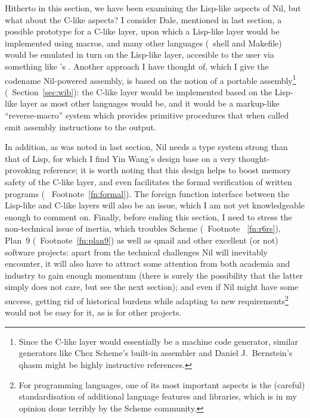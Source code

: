 Hitherto in this section, we have been examining the Lisp-like aspects of Nil,
but what about the C-like aspects?  I consider Dale, mentioned in last section,
a possible prototype for a C-like layer, upon which a Lisp-like layer would
be implemented using macros, and many other languages (\eg~shell and Makefile)
would be emulated in turn on the Lisp-like layer, accesible to the user via
something like 's .  Another approach I
have thought of, which I give the codename Nil-powered assembly, is based on the
notion of a portable assembly\footnote{Since the C-like layer would essentially
be a machine code generator, similar generators like Chez Scheme's built-in
assembler and Daniel J.\ Bernstein's qhasm might be highly instructive
references.} (\cf~Section~\ref{sec:wib}): the C-like layer would be implemented
based on the Lisp-like layer as most other languages would be, and it
would be a markup-like ``reverse-macro'' system which provides primitive
procedures that when called emit assembly instructions to the output.

In addition, as was noted in last section, Nil needs a type system strong than
that of Lisp, for which I find Yin Wang's design base on %
 a very thought-provoking reference; it is
worth noting that this design helps to boost memory safety of the C-like layer,
and even facilitates the formal verification of written programs (\cf~%
Footnote~\ref{fn:formal}).  The foreign function interface between the Lisp-like
and C-like layers will also be an issue, which I am not yet knowledgeable enough
to comment on.  Finally, before ending this section, I need to stress the
non-technical issue of inertia, which troubles Scheme (\cf~Footnote~%
\ref{fn:r6rs}), Plan~9 (\cf~Footnote~\ref{fn:plan9}) as well as qmail and
other excellent (or not) software projects: apart from the technical challenges
Nil will inevitably encounter, it will also have to attract some attention
from both academia and industry to gain enough momentum (there is surely the
possibility that the latter simply does not care, but see the next section);
and even if Nil might have some success, getting rid of historical burdens
while adapting to new requirements\footnote{For programming languages, one
of its most important aspects is the (careful) standardisation of additional
language features and libraries, which is in my opinion done terribly by
the Scheme community.} would not be easy for it, as is for other projects.

